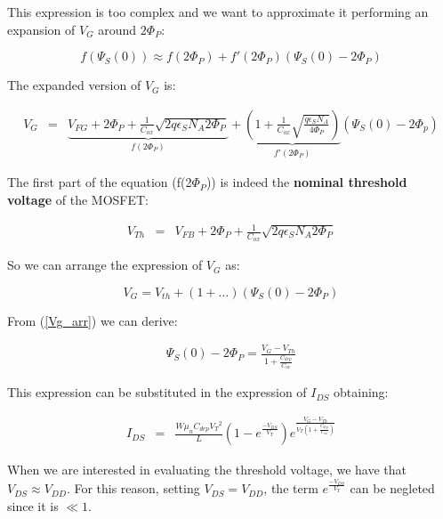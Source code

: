 \documentclass[a4paper, 12pt, twoside, openright]{report}
\begin{document}
This expression is too complex and we want to approximate it performing an expansion of $V_{G}$ around $2\Phi_P$:

\begin{equation}
f(\Psi_S(0)) \approx f(2\Phi_P) + f'(2\Phi_P)(\Psi_S(0) - 2\Phi_P)
\label{}
\end{equation}

The expanded version of $V_{G}$ is:

	\begin{eqnarray*}
	   V_G &=&  \underbrace{V_{FG}+2\Phi_P+\frac{1}{C_{ox}}\sqrt{2q\epsilon_S N_A 2\Phi_P}}_{f(2\Phi_P)} +  \underbrace{\left( 1+ \frac{1}{C_{ox}}\sqrt{\frac{q\epsilon_SN_A}{4\Phi_P}}\right)}_{f'(2\Phi_P)} \left(\Psi_S(0)-2\Phi_p\right)
	\end{eqnarray*}

The first part of the equation (f(2$\Phi_P$)) is indeed the \textbf{nominal threshold voltage} of the MOSFET:

	\begin{eqnarray*}
	   V_{Th} &=& V_{FB}+2\Phi_P+\frac{1}{C_{ox}}\sqrt{2q\epsilon_S N_A 2\Phi_P}
	\end{eqnarray*}

So we can arrange the expression of $V_{G}$ as:

\begin{equation}
V_G = V_{th} + (1+ \dots) (\Psi_S(0) - 2\Phi_P)
\label{Vg_arr}
\end{equation}



From (\ref{Vg_arr}) we can derive:

          \begin{eqnarray*}
             \Psi_S(0)-2\Phi_P=\frac{V_G-V_{Th}}{1 +\frac{C_{dep}}{C_{ox}}}
          \end{eqnarray*}

This expression can be substituted in the expression of $I_{DS}$ obtaining:

    \begin{eqnarray*}
    I_{DS}    &=& \frac{W \mu_n C_{dep} {V_T}^2}{L}
                  \left( 1-e^{\displaystyle\frac{-V_{DS}}{V_T}}\right) 
            e^{\displaystyle \frac{ {V_G-V_{Th}}}{V_T\left(1 +\frac{C_{dep}}{C_{ox}}\right)}} 
     \end{eqnarray*}

When we are interested in evaluating the threshold voltage, we have that $V_{DS} \approx V_{DD}$. For this reason, setting $V_{DS} = V_{DD}$, the term $e^{\frac{-V_{DS}}{V_T}}$ can be negleted since it is $\ll 1$.
\end{document}
